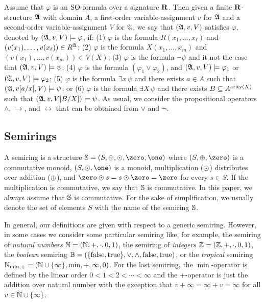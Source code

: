 Assume that $\varphi$ is an ${\rm SO}$-formula over a signature $\mathbf{R}$. Then given a finite $\mathbf{R}$-structure $\mathfrak{A}$ with domain $A$, a first-order variable-assignment $v$ for $\mathfrak{A}$ and a second-order variable-assignment $V$ for $\mathfrak{A}$, we say that $(\mathfrak{A}, v, V)$ satisfies $\varphi$, denoted by $(\mathfrak{A}, v, V) \models \varphi$, if: (1) $\varphi$ is the formula $R(x_1, \ldots, x_\ell)$ and $(v(x_1), \ldots, v(x_\ell)) \in R^{\mathfrak{A}}$; (2) $\varphi$ is the formula $X(x_1, \ldots, x_m)$ and $(v(x_1), \ldots, v(x_m)) \in V(X)$; (3) $\varphi$ is the formula $\neg \psi$ and it not the case that $(\mathfrak{A}, v, V) \models \psi$; (4) $\varphi$ is the formula $(\varphi_1 \vee \varphi_2)$, and $(\mathfrak{A}, v, V) \models \varphi_1$ or $(\mathfrak{A}, v, V) \models \varphi_2$; (5) $\varphi$ is the formula $\exists x \, \psi$ and there exists $a \in A$ such that $(\mathfrak{A}, v[a/x], V) \models \psi$; or (6) $\varphi$ is the formula $\exists X \, \psi$ and there exists $B \subseteq A^{{\rm arity}(X)}$ such that $(\mathfrak{A}, v, V[B/X]) \models \psi$.  As usual, we consider the propositional operators $\wedge$, $\rightarrow$, and $\leftrightarrow$ that can be obtained from $\vee$ and $\neg$. 

\subsection{Semirings}

A semiring is a structure $\SR = (S, \adds, \mults, \zero, \one)$ where $(S, \adds, \zero)$ is a commutative monoid, $(S, \mults, \one)$ is a monoid, multiplication ($\odot$) distributes over addition ($\oplus$), and $\zero \mults s = s \mults \zero = \zero$ for every $s \in S$. If the multiplication is commutative, we say that $\mathbb{S}$ is commutative. In this paper, we always assume that $\mathbb{S}$ is  commutative.
For the sake of simplification, we usually denote the set of elements $S$ with the name of the semiring $\mathbb{S}$.

In general, our definitions are given with respect to a generic semiring.
However, in some cases we consider some particular semiring like, for example, the semiring of \emph{natural numbers} $\mathbb{N} = (\mathbb{N}, +, \cdot, 0, 1)$, the semiring of \emph{integers} $\mathbb{Z} = (\mathbb{Z}, +, \cdot, 0, 1)$, the \emph{boolean} semiring $\mathbb{B} = (\{\operatorname{false}, \operatorname{true}\}, \vee, \wedge, \operatorname{false}, \operatorname{true})$, or the \emph{tropical} semiring $\mathbb{N}_{\min,+} = (\mathbb{N} \cup \{\infty\}, \min, +, \infty, 0)$.
For the last semiring, the $\min$-operator is defined by the linear order $0 < 1 < 2 < \cdots < \infty$ and the $+$-operator is just the addition over natural number with the exception that $v + \infty = \infty + v = \infty$ for all $v \in \mathbb{N} \cup \{\infty\}$.

